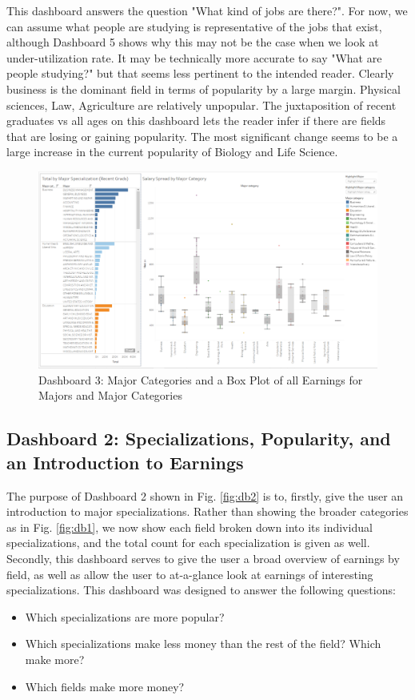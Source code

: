 \documentclass[sigchi]{acmart}
\begin{document}
This dashboard answers the question "What kind of jobs are there?". For now, we can assume what people are studying is representative of the jobs that exist, although Dashboard 5 shows why this may not be the case when we look at under-utilization rate. It may be technically more accurate to say "What are people studying?" but that seems less pertinent to the intended reader. Clearly business is the dominant field in terms of popularity by a large margin. Physical sciences, Law, Agriculture are relatively unpopular. The juxtaposition of recent graduates vs all ages on this dashboard lets the reader infer if there are fields that are losing or gaining popularity. The most significant change seems to be a large increase in the current popularity of Biology and Life Science.


  \begin{figure}[thpb]
  \includegraphics[width=1.0\textwidth]{DB3.png}
     \caption{Dashboard 3: Major Categories and a Box Plot of all Earnings for Majors and Major Categories}
         \label{fig:db3}
  \end{figure}

\subsection{Dashboard 2: Specializations, Popularity, and an Introduction to Earnings}
\label{sec:db2}

The purpose of Dashboard 2 shown in Fig. \ref{fig:db2} is to, firstly, give the user an introduction to major specializations. Rather than showing the broader categories as in Fig. \ref{fig:db1}, we now show each field broken down into its individual specializations, and the total count for each specialization is given as well. Secondly, this dashboard serves to give the user a broad overview of earnings by field, as well as allow the user to at-a-glance look at earnings of interesting specializations. This dashboard was designed to answer the following questions: 
\begin{itemize}
\item{Which specializations are more popular?}
\item{Which specializations make less money than the rest of the field?  Which make more?}
\item{Which fields make more money?}
\end{itemize}
\end{document}
